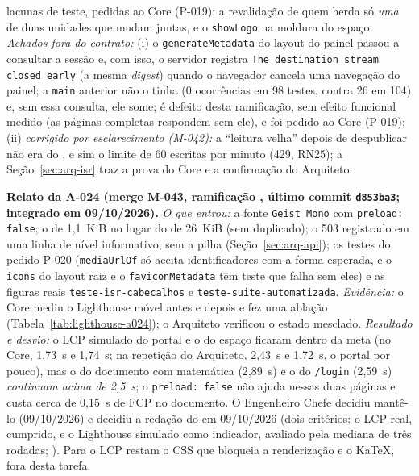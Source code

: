 lacunas de teste, pedidas ao Core (P-019): a revalidação de quem herda só \emph{uma} de duas unidades que mudam juntas, e o \texttt{showLogo} na moldura do espaço. \emph{Achados fora do contrato:} (i) o \texttt{generateMetadata} do layout do painel passou a consultar a sessão e, com isso, o servidor registra \texttt{The destination stream closed early} (a mesma \emph{digest}) quando o navegador cancela uma navegação do painel; a \texttt{main} anterior não o tinha (0 ocorrências em 98 testes, contra 26 em 104) e, sem essa consulta, ele some; é defeito desta ramificação, sem efeito funcional medido (as páginas completas respondem sem ele), e foi pedido ao Core (P-019); (ii) \emph{corrigido por esclarecimento (M-042):} a ``leitura velha'' depois de despublicar não era do , e sim o limite de 60 escritas por minuto (429, RN25); a Seção~\ref{sec:arq-isr} traz a prova do Core e a confirmação do Arquiteto.


\noindent{}\quad \textbf{Relato da A-024 (merge M-043, ramificação , último commit \texttt{d853ba3}; integrado em 09/10/2026).} \emph{O que entrou:} a fonte \texttt{Geist\_Mono} com \texttt{preload: false}; o  de 1,1~KiB no lugar do de 26~KiB (sem  duplicado); o 503  registrado em uma linha de nível informativo, sem a pilha (Seção~\ref{sec:arq-api}); os testes do pedido P-020 (\texttt{mediaUrlOf} só aceita identificadores com a forma esperada, e o \texttt{icons} do layout raiz e o \texttt{faviconMetadata} têm teste que falha sem eles) e as figuras reais \texttt{teste-isr-cabecalhos} e \texttt{teste-suite-automatizada}. \emph{Evidência:} o Core mediu o Lighthouse móvel antes e depois e fez uma ablação (Tabela~\ref{tab:lighthouse-a024}); o Arquiteto verificou o estado mesclado. \emph{Resultado e desvio:} o LCP simulado do portal e o do espaço ficaram dentro da meta (no Core, 1,73~s e 1,74~s; na repetição do Arquiteto, 2,43~s e 1,72~s, o portal por pouco), mas o do documento com matemática (2,89~s) e o do \texttt{/login} (2,59~s) \emph{continuam acima de 2,5~s}; o \texttt{preload: false} não ajuda nessas duas páginas e custa cerca de 0,15~s de FCP no documento. O Engenheiro Chefe decidiu mantê-lo (09/10/2026) e decidiu a redação do  em 09/10/2026 (dois critérios: o LCP real, cumprido, e o Lighthouse simulado como indicador, avaliado pela mediana de três rodadas; ). Para o LCP restam o CSS que bloqueia a renderização e o KaTeX, fora desta tarefa.


